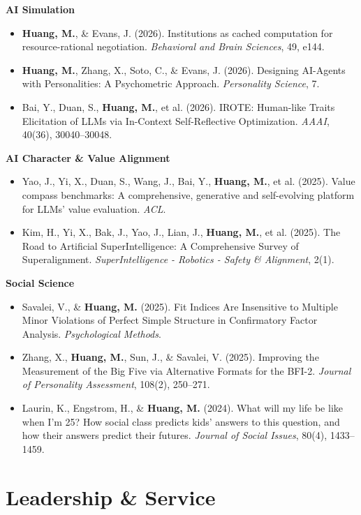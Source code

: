 \documentclass[10pt,letterpaper]{article}
\begin{document}
{\small
{}
\noindent\textbf{AI Simulation}
\begin{itemize}
  \item \textbf{Huang, M.}, \& Evans, J. (2026). Institutions as cached computation for resource-rational negotiation. \textit{Behavioral and Brain Sciences}, 49, e144.
  \item \textbf{Huang, M.}, Zhang, X., Soto, C., \& Evans, J. (2026). Designing AI-Agents with Personalities: A Psychometric Approach. \textit{Personality Science}, 7.
  \item Bai, Y., Duan, S., \textbf{Huang, M.}, et al. (2026). IROTE: Human-like Traits Elicitation of LLMs via In-Context Self-Reflective Optimization. \textit{AAAI}, 40(36), 30040--30048.
\end{itemize}
\noindent\textbf{AI Character \& Value Alignment}
\begin{itemize}
  \item Yao, J., Yi, X., Duan, S., Wang, J., Bai, Y., \textbf{Huang, M.}, et al. (2025). Value compass benchmarks: A comprehensive, generative and self-evolving platform for LLMs' value evaluation. \textit{ACL}.
  \item Kim, H., Yi, X., Bak, J., Yao, J., Lian, J., \textbf{Huang, M.}, et al. (2025). The Road to Artificial SuperIntelligence: A Comprehensive Survey of Superalignment. \textit{SuperIntelligence - Robotics - Safety \& Alignment}, 2(1).
\end{itemize}
\noindent\textbf{Social Science}
\begin{itemize}
  \item Savalei, V., \& \textbf{Huang, M.} (2025). Fit Indices Are Insensitive to Multiple Minor Violations of Perfect Simple Structure in Confirmatory Factor Analysis. \textit{Psychological Methods}.
  \item Zhang, X., \textbf{Huang, M.}, Sun, J., \& Savalei, V. (2025). Improving the Measurement of the Big Five via Alternative Formats for the BFI-2. \textit{Journal of Personality Assessment}, 108(2), 250--271.
  \item Laurin, K., Engstrom, H., \& \textbf{Huang, M.} (2024). What will my life be like when I'm 25? How social class predicts kids' answers to this question, and how their answers predict their futures. \textit{Journal of Social Issues}, 80(4), 1433--1459.
\end{itemize}
}

\section*{Leadership \& Service}
\end{document}
